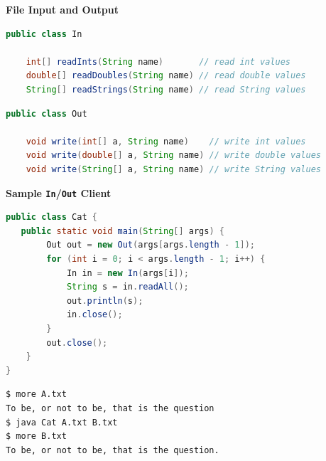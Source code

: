 \documentclass[8pt,a4paper,compress]{beamer}
\begin{document}
\begin{frame}[fragile]
\pause

\textbf{File Input and Output}

\begin{lstlisting}[language=Java]
public class In

    int[] readInts(String name)       // read int values
    double[] readDoubles(String name) // read double values
    String[] readStrings(String name) // read String values
\end{lstlisting}

\begin{lstlisting}[language=Java]
public class Out

    void write(int[] a, String name)    // write int values
    void write(double[] a, String name) // write double values
    void write(String[] a, String name) // write String values
\end{lstlisting}

\pause
\smallskip

\textbf{Sample \lstinline$In$/\lstinline$Out$ Client}

\begin{lstlisting}[language=Java]
public class Cat { 
   public static void main(String[] args) { 
        Out out = new Out(args[args.length - 1]);
        for (int i = 0; i < args.length - 1; i++) {
            In in = new In(args[i]);
            String s = in.readAll();
            out.println(s);
            in.close();
        }
        out.close();
    }
}
\end{lstlisting}

\pause

\begin{lstlisting}[language=bash]
$ more A.txt
To be, or not to be, that is the question
$ java Cat A.txt B.txt
$ more B.txt
To be, or not to be, that is the question.

\end{lstlisting}
\end{frame}
\end{document}
